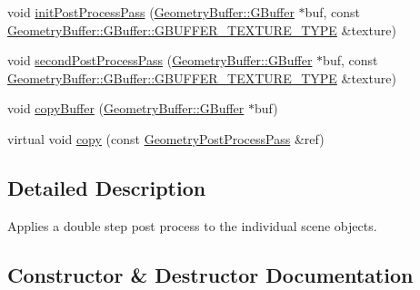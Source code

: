 \begin{DoxyCompactItemize}
\item 
void \mbox{\hyperlink{class_geometry_engine_1_1_geometry_render_step_1_1_geometry_post_process_pass_a8cbd2300fb946abdde65a4339fcfa752}{init\+Post\+Process\+Pass}} (\mbox{\hyperlink{class_geometry_engine_1_1_geometry_buffer_1_1_g_buffer}{Geometry\+Buffer\+::\+G\+Buffer}} $\ast$buf, const \mbox{\hyperlink{class_geometry_engine_1_1_geometry_buffer_1_1_g_buffer_a718dceafcac1915f7de061108597e1cc}{Geometry\+Buffer\+::\+G\+Buffer\+::\+G\+B\+U\+F\+F\+E\+R\+\_\+\+T\+E\+X\+T\+U\+R\+E\+\_\+\+T\+Y\+PE}} \&texture)
\item 
void \mbox{\hyperlink{class_geometry_engine_1_1_geometry_render_step_1_1_geometry_post_process_pass_ae5bd76667c5fce0189983e4d32b20b83}{second\+Post\+Process\+Pass}} (\mbox{\hyperlink{class_geometry_engine_1_1_geometry_buffer_1_1_g_buffer}{Geometry\+Buffer\+::\+G\+Buffer}} $\ast$buf, const \mbox{\hyperlink{class_geometry_engine_1_1_geometry_buffer_1_1_g_buffer_a718dceafcac1915f7de061108597e1cc}{Geometry\+Buffer\+::\+G\+Buffer\+::\+G\+B\+U\+F\+F\+E\+R\+\_\+\+T\+E\+X\+T\+U\+R\+E\+\_\+\+T\+Y\+PE}} \&texture)
\item 
void \mbox{\hyperlink{class_geometry_engine_1_1_geometry_render_step_1_1_geometry_post_process_pass_aad8136ef6518e5da3cc5c3bc7f588ab5}{copy\+Buffer}} (\mbox{\hyperlink{class_geometry_engine_1_1_geometry_buffer_1_1_g_buffer}{Geometry\+Buffer\+::\+G\+Buffer}} $\ast$buf)
\item 
virtual void \mbox{\hyperlink{class_geometry_engine_1_1_geometry_render_step_1_1_geometry_post_process_pass_a9bd55bb78722a0b6dc30910654b159b5}{copy}} (const \mbox{\hyperlink{class_geometry_engine_1_1_geometry_render_step_1_1_geometry_post_process_pass}{Geometry\+Post\+Process\+Pass}} \&ref)
\end{DoxyCompactItemize}


\subsection{Detailed Description}
Applies a double step post process to the individual scene objects. 

\subsection{Constructor \& Destructor Documentation}
\mbox{\label{class_geometry_engine_1_1_geometry_render_step_1_1_geometry_post_process_pass_ae24ec0dbcc8082d4d45d1b1a09993fd2}} 

